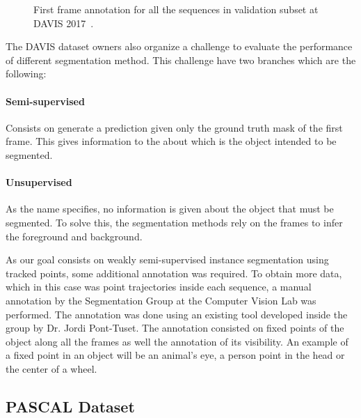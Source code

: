 \begin{figure}[h]
  \centering
  \caption{First frame annotation for all the sequences in validation subset at DAVIS 2017~\cite{PontTuset2017}.}
  \label{fig:davis}
\end{figure}


The DAVIS dataset owners also organize a challenge to evaluate the performance of different segmentation method.
This challenge have two branches which are the following:

\paragraph{Semi-supervised}

Consists on generate a prediction given only the ground truth mask of the first frame.
This gives information to the about which is the object intended to be segmented.

\paragraph{Unsupervised}

As the name specifies, no information is given about the object that must be segmented.
To solve this, the segmentation methods rely on the frames to infer the foreground and background.

As our goal consists on weakly semi-supervised instance segmentation using tracked points, some additional annotation was required.
To obtain more data, which in this case was point trajectories inside each sequence, a manual annotation by the Segmentation Group at the Computer Vision Lab was performed.
The annotation was done using an existing tool developed inside the group by Dr. Jordi Pont-Tuset.
The annotation consisted on fixed points of the object along all the frames as well the annotation of its visibility.
An example of a fixed point in an object will be an animal's eye, a person point in the head or the center of a wheel.

\subsection{PASCAL Dataset}

